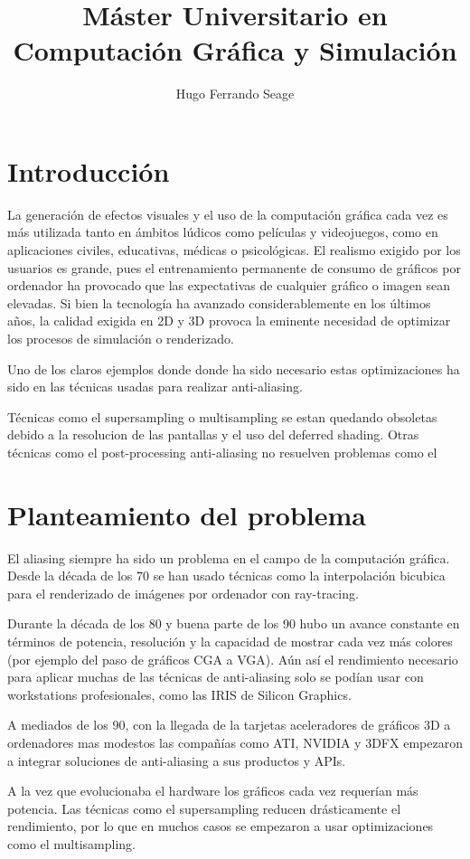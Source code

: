 \documentclass[withindex, glossary]{cam-thesis}
\title{Máster Universitario en Computación Gráfica y Simulación\protect\\\bigskip \normalfont{2018\protect\\\bigskip Trabajo Final de Máster\protect\\\bigskip Estudio sobre sistemas de anti-aliasing e implementación de anti-aliasing temporal}}
\author{Hugo Ferrando Seage}
\begin{document}
\frontmatter{}

\chapter{Introducción}

La generación de efectos visuales y el uso de la computación gráfica cada vez es más utilizada tanto en ámbitos lúdicos como películas y videojuegos, como en aplicaciones civiles, educativas, médicas o psicológicas. El realismo exigido por los usuarios es grande, pues el entrenamiento permanente de consumo de gráficos por ordenador ha provocado que las expectativas de cualquier gráfico o imagen sean elevadas. Si bien la tecnología ha avanzado considerablemente en los últimos años, la calidad exigida en 2D y 3D provoca la eminente necesidad de optimizar los procesos de simulación o renderizado. 

Uno de los claros ejemplos donde donde ha sido necesario estas optimizaciones ha sido en las técnicas usadas para realizar anti-aliasing.

Técnicas como el supersampling o multisampling se estan quedando obsoletas debido a la resolucion de las pantallas y el uso del deferred shading. Otras técnicas como el post-processing anti-aliasing no resuelven problemas como el 

\chapter{Planteamiento del problema}

El aliasing siempre ha sido un problema en el campo de la computación gráfica. Desde la década de los 70 se han usado técnicas como la interpolación bicubica para el renderizado de imágenes por ordenador con ray-tracing.

Durante la década de los 80 y buena parte de los 90 hubo un avance constante en términos de potencia, resolución y la capacidad de mostrar cada vez más colores (por ejemplo del paso de gráficos CGA a VGA). Aún así el rendimiento necesario para aplicar muchas de las técnicas de anti-aliasing solo se podían usar con workstations profesionales, como las IRIS de Silicon Graphics.

A mediados de los 90, con la llegada de la tarjetas aceleradores de gráficos 3D a ordenadores mas modestos las compañías como ATI, NVIDIA y 3DFX empezaron a integrar soluciones de anti-aliasing a sus productos y APIs.

A la vez que evolucionaba el hardware los gráficos cada vez requerían más potencia. Las técnicas como el supersampling reducen drásticamente el rendimiento, por lo que en muchos casos se empezaron a usar optimizaciones como el multisampling.
\end{document}
